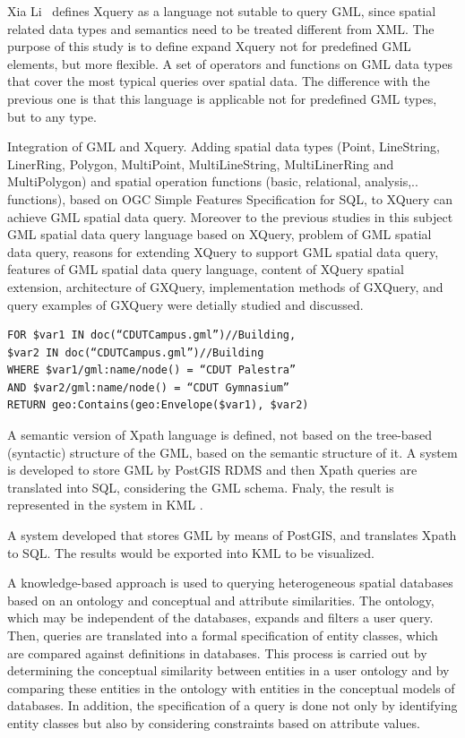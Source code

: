 \documentclass[a4paper,12pt]{article}
\begin{document}
Xia Li~\cite{Lisa2006} defines Xquery as a language  not sutable to query GML, 
since spatial related data types and semantics need to be treated different from XML. 
The purpose of this study is to define expand Xquery not for predefined GML elements, 
but more flexible.  A set of operators and functions on GML data types that cover 
the most typical queries over spatial data. The difference with the previous one is 
that this language is applicable not for predefined GML types, but to any type.

\cite{Chen2010} Integration of GML and Xquery. Adding spatial data types 
(Point, LineString, LinerRing, Polygon, MultiPoint, MultiLineString, MultiLinerRing 
and MultiPolygon) and spatial operation functions (basic, relational, analysis,.. functions), 
based on OGC Simple Features Specification for SQL, to XQuery can achieve GML spatial data query. 
Moreover to the previous studies in this subject GML spatial data query language 
based on XQuery, problem of GML spatial data query, reasons for extending XQuery to
support GML spatial data query, features of GML spatial data query language, 
content of XQuery spatial extension, architecture of GXQuery, implementation methods 
of GXQuery, and query examples of GXQuery were detially studied and discussed. 

\begin{verbatim}
FOR $var1 IN doc(“CDUTCampus.gml”)//Building,
$var2 IN doc(“CDUTCampus.gml”)//Building
WHERE $var1/gml:name/node() = “CDUT Palestra”
AND $var2/gml:name/node() = “CDUT Gymnasium”
RETURN geo:Contains(geo:Envelope($var1), $var2)
\end{verbatim}

\cite{Alemdros2013} A semantic version of Xpath language is defined, not based on the tree-based (syntactic) structure of the GML, based on the semantic structure of it.
A system is developed to store GML by PostGIS RDMS and then Xpath queries are translated into SQL, considering the GML schema. Fnaly, the result is represented in the system in KML \cite{kml}.

\cite{Alemdros2011} A system developed that stores GML by means of PostGIS, and translates Xpath to SQL.
The results would be exported into KML to be visualized.

\cite{Gutierrez2004} A knowledge-based approach is used to querying heterogeneous spatial databases based on an ontology and conceptual and attribute similarities. The ontology, which may be independent of the databases, expands and filters a user query. Then, queries are translated into a formal specification of entity classes, which are compared against definitions in databases. This process is carried out by determining the conceptual similarity between entities in a user ontology and by comparing these entities in the ontology with entities in the conceptual models of databases. In addition, the speciﬁcation of a query is done not only by identifying entity classes but also by considering constraints based on attribute values.
\end{document}
